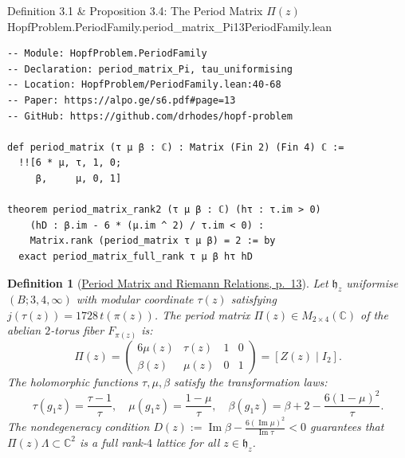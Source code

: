 \documentclass[10pt]{article}
\newtheorem{definition}[theorem]{Definition}
\newcommand{\dbC}{\mathbb{C}}
\newcommand{\hb}{\mathfrak{h}}
\gdef\hashchar{#}
\newcommand{\paperref}[2]{\href{https://alpo.ge/s6.pdf\hashchar page=#1}{#2}}
\begin{document}
\begin{comparativeblock}{Definition 3.1 \& Proposition 3.4: The Period Matrix $\Pi(z)$}{HopfProblem.PeriodFamily.period_matrix_Pi}{13}{PeriodFamily.lean}
\begin{verbatim}
-- Module: HopfProblem.PeriodFamily
-- Declaration: period_matrix_Pi, tau_uniformising
-- Location: HopfProblem/PeriodFamily.lean:40-68
-- Paper: https://alpo.ge/s6.pdf#page=13
-- GitHub: https://github.com/drhodes/hopf-problem

def period_matrix (τ μ β : ℂ) : Matrix (Fin 2) (Fin 4) ℂ :=
  !![6 * μ, τ, 1, 0;
     β,     μ, 0, 1]

theorem period_matrix_rank2 (τ μ β : ℂ) (hτ : τ.im > 0)
    (hD : β.im - 6 * (μ.im ^ 2) / τ.im < 0) :
    Matrix.rank (period_matrix τ μ β) = 2 := by
  exact period_matrix_full_rank τ μ β hτ hD
\end{verbatim}
\tcblower
\begin{definition}[\paperref{13}{Period Matrix and Riemann Relations, p.~13}]\label{def:period-matrix}
Let $\hb_z$ uniformise $(B; 3, 4, \infty)$ with modular coordinate $\tau(z)$ satisfying $j(\tau(z)) = 1728\,t(\pi(z))$.
The period matrix $\Pi(z) \in M_{2 \times 4}(\dbC)$ of the abelian $2$-torus fiber $F_{\pi(z)}$ is:
\[
\Pi(z) = \begin{pmatrix} 6\mu(z) & \tau(z) & 1 & 0 \\ \beta(z) & \mu(z) & 0 & 1 \end{pmatrix} = [Z(z) \mid I_2].
\]
The holomorphic functions $\tau, \mu, \beta$ satisfy the transformation laws:
\[
\tau(g_1 z) = \frac{\tau-1}{\tau}, \quad \mu(g_1 z) = \frac{1-\mu}{\tau}, \quad \beta(g_1 z) = \beta + 2 - \frac{6(1-\mu)^2}{\tau}.
\]
The nondegeneracy condition $D(z) := \operatorname{Im}\beta - \frac{6(\operatorname{Im}\mu)^2}{\operatorname{Im}\tau} < 0$ guarantees that $\Pi(z)\Lambda \subset \dbC^2$ is a full rank-$4$ lattice for all $z \in \hb_z$.
\end{definition}
\end{comparativeblock}
\end{document}
